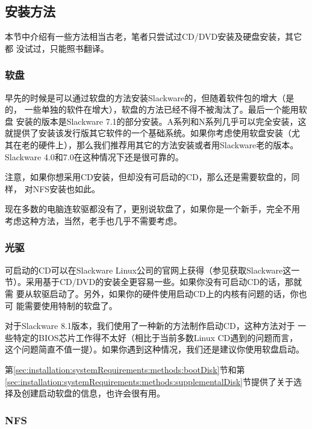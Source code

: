 \subsection{安装方法}
\label{sec:installation:systemRequirements:methods}
本节中介绍有一些方法相当古老，笔者只尝试过CD/DVD安装及硬盘安装，其它都
没试过，只能照书翻译。
\subsubsection{软盘}
\label{sec:installation:systemRequirements:methods:floppy}
早先的时候是可以通过软盘的方法安装Slackware的，但随着软件包的增大（是的，
一些单独的软件在增大），软盘的方法已经不得不被淘汰了。最后一个能用软盘
安装的版本是Slackware 7.1的部分安装。A系列和N系列几乎可以完全安装，这
就提供了安装该发行版其它软件的一个基础系统。如果你考虑使用软盘安装（尤
其在老的硬件上），那么我们推荐用其它的方法安装或者用Slackware老的版本。
Slackware 4.0和7.0在这种情况下还是很可靠的。

注意，如果你想采用CD安装，但却没有可启动的CD，那么还是需要软盘的，同样，
对NFS安装也如此。

现在多数的电脑连软驱都没有了，更别说软盘了，如果你是一个新手，完全不用
考虑这种方法，当然，老手也几乎不需要考虑。

\subsubsection{光驱}
\label{sec:installation:systemRequirements:methods:cdrom}

可启动的CD可以在Slackware Linux公司的官网上获得（参见获取Slackware这一
节）。采用基于CD/DVD的安装全更容易一些。如果你没有可启动CD的话，那就需
要从软驱启动了。另外，如果你的硬件使用启动CD上的内核有问题的话，你也可
能需要使用特制的软盘了。

对于Slackware 8.1版本，我们使用了一种新的方法制作启动CD，这种方法对于
一些特定的BIOS芯片工作得不太好（相比于当前多数Linux CD遇到的问题而言，
这个问题简直不值一提）。如果你遇到这种情况，我们还是建议你使用软盘启动。

第\ref{sec:installation:systemRequirements:methods:bootDisk}节和第\ref{sec:installation:systemRequirements:methods:supplementalDisk}节提供了关于选择及创建启动软盘的信息，也许会很有用。

\subsubsection{NFS}
\label{sec:installation:systemRequirements:methods:nfs}

